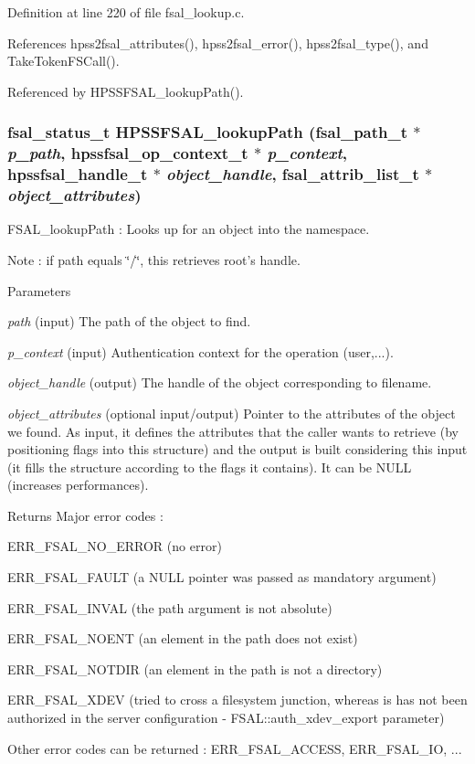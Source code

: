 Definition at line 220 of file fsal\_\-lookup.c.

References hpss2fsal\_\-attributes(), hpss2fsal\_\-error(), hpss2fsal\_\-type(), and TakeTokenFSCall().

Referenced by HPSSFSAL\_\-lookupPath().
\subsubsection[{HPSSFSAL\_\-lookupPath}]{\setlength{\rightskip}{0pt plus 5cm}fsal\_\-status\_\-t HPSSFSAL\_\-lookupPath (fsal\_\-path\_\-t $\ast$ {\em p\_\-path}, \/  hpssfsal\_\-op\_\-context\_\-t $\ast$ {\em p\_\-context}, \/  hpssfsal\_\-handle\_\-t $\ast$ {\em object\_\-handle}, \/  fsal\_\-attrib\_\-list\_\-t $\ast$ {\em object\_\-attributes})}\label{fsal__lookup_8c_a628bea09f8e29e449b342db17e91ccd7}
FSAL\_\-lookupPath : Looks up for an object into the namespace.

Note : if path equals \char`\"{}/\char`\"{}, this retrieves root's handle.


\begin{DoxyParams}{Parameters}
\item[{\em path}](input) The path of the object to find. \item[{\em p\_\-context}](input) Authentication context for the operation (user,...). \item[{\em object\_\-handle}](output) The handle of the object corresponding to filename. \item[{\em object\_\-attributes}](optional input/output) Pointer to the attributes of the object we found. As input, it defines the attributes that the caller wants to retrieve (by positioning flags into this structure) and the output is built considering this input (it fills the structure according to the flags it contains). It can be NULL (increases performances).\end{DoxyParams}
\begin{DoxyReturn}{Returns}
Major error codes :
\begin{DoxyItemize}
\item ERR\_\-FSAL\_\-NO\_\-ERROR (no error)
\item ERR\_\-FSAL\_\-FAULT (a NULL pointer was passed as mandatory argument)
\item ERR\_\-FSAL\_\-INVAL (the path argument is not absolute)
\item ERR\_\-FSAL\_\-NOENT (an element in the path does not exist)
\item ERR\_\-FSAL\_\-NOTDIR (an element in the path is not a directory)
\item ERR\_\-FSAL\_\-XDEV (tried to cross a filesystem junction, whereas is has not been authorized in the server configuration -\/ FSAL::auth\_\-xdev\_\-export parameter)
\item Other error codes can be returned : ERR\_\-FSAL\_\-ACCESS, ERR\_\-FSAL\_\-IO, ... 
\end{DoxyItemize}
\end{DoxyReturn}



